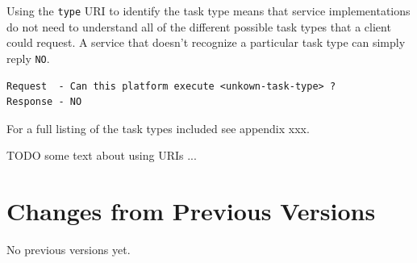 \documentclass[11pt,a4paper]{ivoa}
\newcommand{\codeword}[1] {\texttt{#1}}
\begin{document}
Using the \codeword{type} URI to identify the task type means that service implementations do not need to understand
all of the different possible task types that a client could request.
A service that doesn’t recognize a particular task type can simply reply \codeword{NO}.

\begin{lstlisting}[]
Request  - Can this platform execute <unkown-task-type> ?
Response - NO
\end{lstlisting}

For a full listing of the task types included see appendix xxx.

TODO some text about using URIs ...



\appendix
\section{Changes from Previous Versions}

No previous versions yet.



\end{document}
